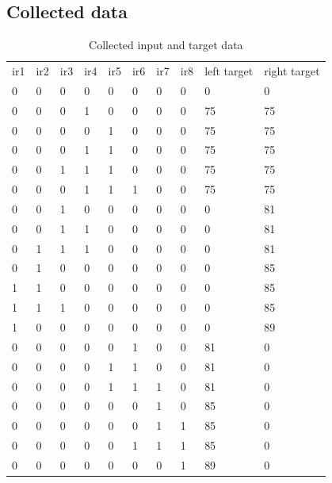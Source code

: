 \documentclass[14pt,a4paper]{extarticle}
\begin{document}
	\subsection{Collected data}
	
	\begin{table}[H]
\centering
\caption{Collected input and target data}
\label{my-label}
\begin{tabular}{llllllllll}
ir1 & ir2 & ir3 & ir4 & ir5 & ir6 & ir7 & ir8 & left target & right target \\
0   & 0   & 0   & 0   & 0   & 0   & 0   & 0   & 0           & 0            \\
0   & 0   & 0   & 1   & 0   & 0   & 0   & 0   & 75          & 75           \\
0   & 0   & 0   & 0   & 1   & 0   & 0   & 0   & 75          & 75           \\
0   & 0   & 0   & 1   & 1   & 0   & 0   & 0   & 75          & 75           \\
0   & 0   & 1   & 1   & 1   & 0   & 0   & 0   & 75          & 75           \\
0   & 0   & 0   & 1   & 1   & 1   & 0   & 0   & 75          & 75           \\
0   & 0   & 1   & 0   & 0   & 0   & 0   & 0   & 0           & 81           \\
0   & 0   & 1   & 1   & 0   & 0   & 0   & 0   & 0           & 81           \\
0   & 1   & 1   & 1   & 0   & 0   & 0   & 0   & 0           & 81           \\
0   & 1   & 0   & 0   & 0   & 0   & 0   & 0   & 0           & 85           \\
1   & 1   & 0   & 0   & 0   & 0   & 0   & 0   & 0           & 85           \\
1   & 1   & 1   & 0   & 0   & 0   & 0   & 0   & 0           & 85           \\
1   & 0   & 0   & 0   & 0   & 0   & 0   & 0   & 0           & 89           \\
0   & 0   & 0   & 0   & 0   & 1   & 0   & 0   & 81          & 0            \\
0   & 0   & 0   & 0   & 1   & 1   & 0   & 0   & 81          & 0            \\
0   & 0   & 0   & 0   & 1   & 1   & 1   & 0   & 81          & 0            \\
0   & 0   & 0   & 0   & 0   & 0   & 1   & 0   & 85          & 0            \\
0   & 0   & 0   & 0   & 0   & 0   & 1   & 1   & 85          & 0            \\
0   & 0   & 0   & 0   & 0   & 1   & 1   & 1   & 85          & 0            \\
0   & 0   & 0   & 0   & 0   & 0   & 0   & 1   & 89          & 0           
\end{tabular}
\end{table}
\end{document}
